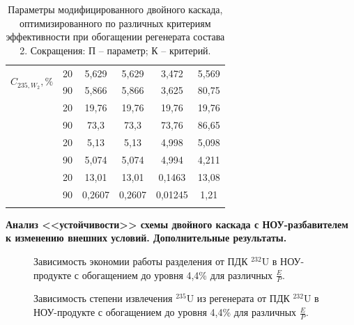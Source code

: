 \begin{table}[ht]
\begin{tabular}{|r|r||c|c|c|c|}
      \multirow{2}{*}{$C_{235,W_{2}}, \%$}
          & 20 & 5,629 & 5,629 & 3,472 & 5,569 \\\cline{2-6} 
          & 90 & 5,866 & 5,866 & 3,625 & 80,75\\
  \Xhline{2\arrayrulewidth}
      \multirow{2}{*}{$C_{235,P_{2}}, \%$}
          & 20 & 19,76 & 19,76 & 19,76 & 19,76 \\\cline{2-6} 
          & 90 & 73,3 & 73,3 & 73,76 & 86,65\\
      \Xhline{2\arrayrulewidth}
      \multirow{2}{*}{$C_{235,P_{n}}, \%$}
          & 20 & 5,13 & 5,13 & 4,998 & 5,098 \\\cline{2-6} 
          & 90 & 5,074 & 5,074 & 4,994 & 4,211\\
      \Xhline{2\arrayrulewidth}           
      \multirow{2}{*}{$P_2$, кг}
      & 20 & 13,01 & 13,01 & 0,1463 & 13,08 \\\cline{2-6} 
      & 90 & 0,2607 & 0,2607 & 0,01245 & 1,21\\
\Xhline{2\arrayrulewidth}
      \end{tabular}
      \caption{Параметры модифицированного двойного каскада, оптимизированного по различных критериям эффективности при обогащении регенерата состава 2. Сокращения: П -- параметр; К -- критерий.{\label{2opt2}}}
\end{table}




\textbf{Анализ <<устойчивости>> схемы двойного каскада с НОУ-разбавителем к изменению внешних условий. Дополнительные результаты.}


\begin{figure}
    \centering
    \begin{minipage}{.5\textwidth}
      \centering
      
      \caption{{Зависимость экономии работы разделения от ПДК $^{232}$U в НОУ-продукте с обогащением до уровня 4,4\% для различных $\frac{E}{P}$.{\label{sw44}}}}
    \end{minipage}%
    \begin{minipage}{.5\textwidth}
      \centering
      
      \caption{{Зависимость степени извлечения $^{235}$U из регенерата от ПДК $^{232}$U в НОУ-продукте с обогащением до уровня 4,4\% для различных $\frac{E}{P}$.{\label{exR44}}}}
    \end{minipage}
\end{figure}


